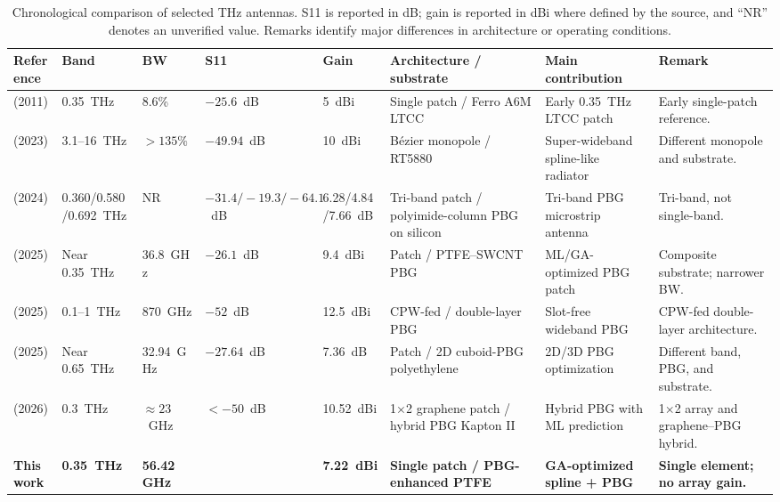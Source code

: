 \documentclass[USenglish]{article}
\begin{document}
\begin{table}
\centering
\small
\caption{Chronological comparison of selected THz antennas. S11 is reported in dB; gain is reported in dBi where defined by the source, and ``NR'' denotes an unverified value. Remarks identify major differences in architecture or operating conditions.}
\label{tab3}
\renewcommand{\arraystretch}{1.15}
\setlength{\tabcolsep}{3pt}
\begin{tabular}{@{}M{2.2cm}C{1.35cm}C{1.1cm}C{1.2cm}C{1.1cm}M{2.0cm}M{2.2cm}M{3.0cm}@{}}
\toprule
\textbf{Reference} & \textbf{Band} & \textbf{BW} & \textbf{S11} & \textbf{Gain} & \textbf{Architecture / substrate} & \textbf{Main contribution} & \textbf{Remark} \\
\midrule
\cite{elnawawy_ltcc_2012} (2011) & 0.35~THz & 8.6\% & $-25.6$~dB & 5~dBi & Single patch / Ferro A6M LTCC & Early 0.35~THz LTCC patch & Early single-patch reference. \\
\cite{marouf_bezier_2023} (2023) & 3.1--16~THz & $>135\%$ & $-49.94$~dB & 10~dBi & Bézier monopole / RT5880 & Super-wideband spline-like radiator & Different monopole and substrate. \\
\cite{li_triband_2024} (2024) & 0.360/0.580/0.692~THz & NR & $-31.4/-19.3/-64.1$~dB & 6.28/4.84/7.66~dB & Tri-band patch / polyimide-column PBG on silicon & Tri-band PBG microstrip antenna & Tri-band, not single-band. \\

\cite{babaahmed_hybrid_2025} (2025) & Near 0.35~THz & 36.8~GHz & $-26.1$~dB & 9.4~dBi & Patch / PTFE--SWCNT PBG & ML/GA-optimized PBG patch & Composite substrate; narrower BW. \\
\cite{boujmil_pbg_2025} (2025) & 0.1--1~THz & 870~GHz & $-52$~dB & 12.5~dBi & CPW-fed / double-layer PBG & Slot-free wideband PBG & CPW-fed double-layer architecture. \\
\cite{bouzid_pbg_2025} (2025) & Near 0.65~THz & 32.94~GHz & $-27.64$~dB & 7.36~dB & Patch / 2D cuboid-PBG polyethylene & 2D/3D PBG optimization & Different band, PBG, and substrate. \\
\cite{reguig_pbg_ml_2026} (2026) & 0.3~THz & $\approx23$~GHz & $<-50$~dB & 10.52~dBi & 1$\times$2 graphene patch / hybrid PBG Kapton II & Hybrid PBG with ML prediction & 1$\times$2 array and graphene--PBG hybrid. \\
\midrule
\textbf{This work} & \textbf{0.35~THz} & \textbf{56.42~GHz} & \textbf{} & \textbf{7.22~dBi} & \textbf{Single patch / PBG-enhanced PTFE} & \textbf{GA-optimized spline + PBG} & \textbf{Single element; no array gain.} \\
\bottomrule
\end{tabular}
\end{table}
\end{document}
